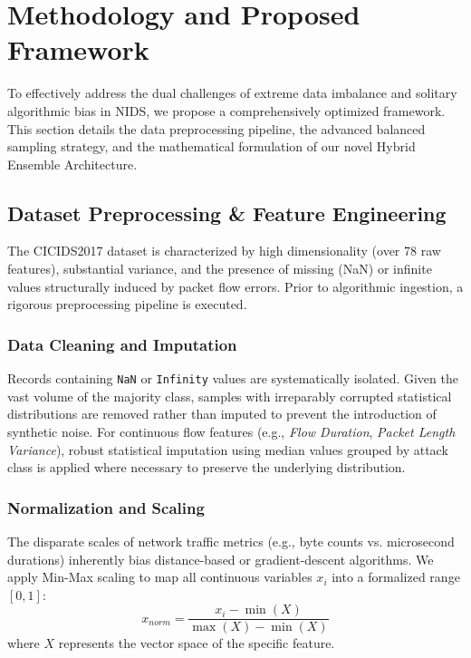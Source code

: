 \section{Methodology and Proposed Framework}
To effectively address the dual challenges of extreme data imbalance and solitary algorithmic bias in NIDS, we propose a comprehensively optimized framework. This section details the data preprocessing pipeline, the advanced balanced sampling strategy, and the mathematical formulation of our novel Hybrid Ensemble Architecture.

\subsection{Dataset Preprocessing \& Feature Engineering}
The CICIDS2017 dataset is characterized by high dimensionality (over 78 raw features), substantial variance, and the presence of missing (NaN) or infinite values structurally induced by packet flow errors. Prior to algorithmic ingestion, a rigorous preprocessing pipeline is executed.

\subsubsection{Data Cleaning and Imputation} 
Records containing \texttt{NaN} or \texttt{Infinity} values are systematically isolated. Given the vast volume of the majority class, samples with irreparably corrupted statistical distributions are removed rather than imputed to prevent the introduction of synthetic noise. For continuous flow features (e.g., \textit{Flow Duration}, \textit{Packet Length Variance}), robust statistical imputation using median values grouped by attack class is applied where necessary to preserve the underlying distribution.

\subsubsection{Normalization and Scaling} 
The disparate scales of network traffic metrics (e.g., byte counts vs. microsecond durations) inherently bias distance-based or gradient-descent algorithms. We apply Min-Max scaling to map all continuous variables $x_i$ into a formalized range $[0, 1]$:
\begin{equation}
x_{norm} = \frac{x_i - \min(X)}{\max(X) - \min(X)}
\end{equation}
where $X$ represents the vector space of the specific feature.

